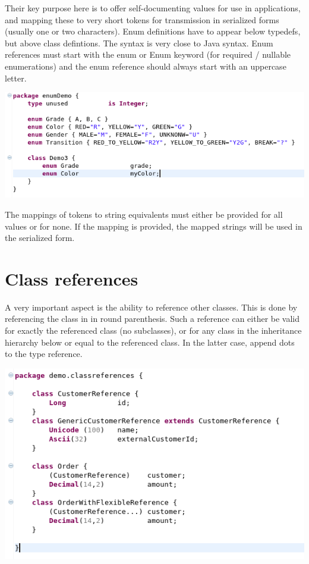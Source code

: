 \documentclass[11pt,a4paper,oneside]{article}
\begin{document}
Their key purpose here is to offer self-documenting values for use in applications, and mapping these to very short tokens
for transmission in serialized forms (usually one or two characters).
Enum definitions have to appear below typedefs, but above class defintions.
The syntax is very close to Java syntax. Enum references must start with the {\ttfamily enum} or {\ttfamily Enum} keyword
 (for required / nullable enumerations) and the enum reference should always start with an uppercase letter.


\vspace{2mm}

\hspace{1cm}\includegraphics[scale=0.5]{images/tut1-013-enum.png}

\noindent The mappings of tokens to string equivalents must either be provided for all values or for none. If the mapping is provided, the
mapped strings will be used in the serialized form.

\section{Class references}
A very important aspect is the ability to reference other classes. This is done by referencing the class in in round parenthesis.
Such a reference can either be valid for exactly the referenced class (no subclasses), or for any class in the inheritance hierarchy below or equal to
 the referenced class. In the latter case, append dots to the type reference.

\vspace{2mm}

\hspace{1cm}\includegraphics[scale=0.5]{images/tut1-014-ref.png}
\end{document}
